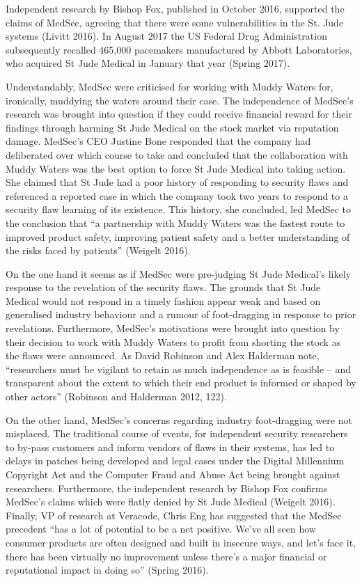 \documentclass{svjour3}                     %
\begin{document}
Independent research by Bishop Fox, published in October 2016, supported the claims of MedSec, agreeing that there were some vulnerabilities in the St. Jude systems (Livitt 2016). In August 2017 the US Federal Drug Administration subsequently recalled 465,000 pacemakers manufactured by Abbott Laboratories, who acquired St Jude Medical in January that year (Spring 2017).

Understandably, MedSec were criticised for working with Muddy Waters for, ironically, muddying the waters around their case. The independence of MedSec’s research was brought into question if they could receive financial reward for their findings through harming St Jude Medical on the stock market via reputation damage. MedSec’s CEO Justine Bone responded that the company had deliberated over which course to take and concluded that the collaboration with Muddy Waters was the best option to force St Jude Medical into taking action.  She claimed that St Jude had a poor history of responding to security flaws and referenced a reported case in which the company took two years to respond to a security flaw learning of its existence.  This history, she concluded, led MedSec to the conclusion that “a partnership with Muddy Waters was the fastest route to improved product safety, improving patient safety and a better understanding of the risks faced by patients” (Weigelt 2016). 

On the one hand it seems as if MedSec were pre-judging St Jude Medical’s likely response to the revelation of the security flaws. The grounds that St Jude Medical would not respond in a timely fashion appear weak and based on generalised industry behaviour and a rumour of foot-dragging in response to prior revelations. Furthermore, MedSec’s motivations were brought into question by their decision to work with Muddy Waters to profit from shorting the stock as the flaws were announced. As David Robinson and Alex Halderman note, “researchers must be vigilant to retain as much independence as is feasible – and transparent about the extent to which their end product is informed or shaped by other actors” (Robinson and Halderman 2012, 122). 

On the other hand, MedSec’s concerns regarding industry foot-dragging were not misplaced. The traditional course of events, for independent security researchers to by-pass customers and inform vendors of flaws in their systems, has led to delays in patches being developed and legal cases under the Digital Millennium Copyright Act and the Computer Fraud and Abuse Act being brought against researchers. Furthermore, the independent research by Bishop Fox confirms MedSec’s claims which were flatly denied by St Jude Medical (Weigelt 2016). Finally, VP of research at Veracode, Chris Eng has suggested that the MedSec precedent “has a lot of potential to be a net positive. We’ve all seen how consumer products are often designed and built in insecure ways, and let’s face it, there has been virtually no improvement unless there’s a major financial or reputational impact in doing so” (Spring 2016).
\end{document}
